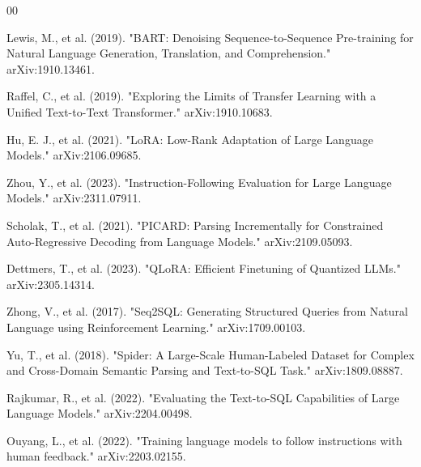 \documentclass[conference]{IEEEtran}
\begin{document}
\begin{thebibliography}{00}

 Lewis, M., et al. (2019). "BART: Denoising Sequence-to-Sequence Pre-training for Natural Language Generation, Translation, and Comprehension." arXiv:1910.13461.

 Raffel, C., et al. (2019). "Exploring the Limits of Transfer Learning with a Unified Text-to-Text Transformer." arXiv:1910.10683.

 Hu, E. J., et al. (2021). "LoRA: Low-Rank Adaptation of Large Language Models." arXiv:2106.09685.

 Zhou, Y., et al. (2023). "Instruction-Following Evaluation for Large Language Models." arXiv:2311.07911.

 Scholak, T., et al. (2021). "PICARD: Parsing Incrementally for Constrained Auto-Regressive Decoding from Language Models." arXiv:2109.05093.

 Dettmers, T., et al. (2023). "QLoRA: Efficient Finetuning of Quantized LLMs." arXiv:2305.14314.

 Zhong, V., et al. (2017). "Seq2SQL: Generating Structured Queries from Natural Language using Reinforcement Learning." arXiv:1709.00103.

 Yu, T., et al. (2018). "Spider: A Large-Scale Human-Labeled Dataset for Complex and Cross-Domain Semantic Parsing and Text-to-SQL Task." arXiv:1809.08887.

 Rajkumar, R., et al. (2022). "Evaluating the Text-to-SQL Capabilities of Large Language Models." arXiv:2204.00498.

 Ouyang, L., et al. (2022). "Training language models to follow instructions with human feedback." arXiv:2203.02155.

\end{thebibliography}
\end{document}
